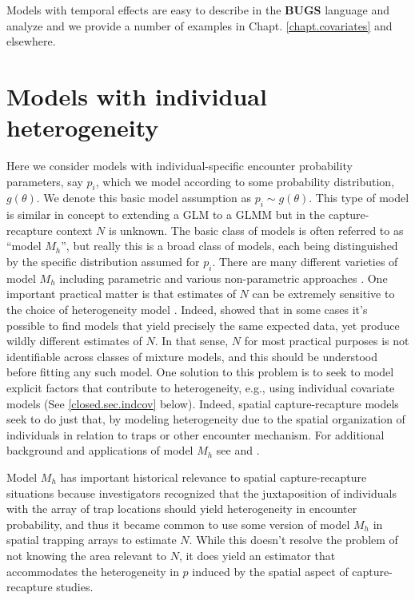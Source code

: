 Models with temporal effects are easy to describe in the {\bf BUGS} language
and analyze and we provide a number of examples in
Chapt. \ref{chapt.covariates} and elsewhere.


\section{ Models with individual heterogeneity}
\label{closed.sec.modelmh}

Here we consider models with individual-specific encounter probability
parameters, say $p_{i}$, which we model according to some probability
distribution, $g(\theta)$. We denote this basic model assumption as
$p_{i} \sim g(\theta)$. This type of model is similar in concept to
extending a GLM to a GLMM but in the capture-recapture context $N$ is
unknown.  The basic class of models is often referred to as ``model
$M_h$'', but really this is a broad class of models, each being
distinguished by the specific distribution assumed for $p_{i}$.  There
are many different varieties of model $M_{h}$ including parametric and
various %
non-parametric approaches
\citep{burnham_overton:1978, norris_pollock:1996, pledger:2000}. One
important practical matter is that estimates of $N$ can be extremely
sensitive to the choice of heterogeneity model
\citep{fienberg_etal:1999, dorazio_royle:2003, link:2003}. Indeed,
\citet{link:2003} showed that in some cases it's possible to find
models that yield precisely the same expected data, yet produce wildly
different estimates of $N$. In that sense, $N$ for most practical
purposes is not identifiable across classes of mixture models, and
this should be understood before fitting any such model. One solution
to this problem is to seek to model explicit factors that contribute
to heterogeneity, e.g., using individual covariate models (See
\ref{closed.sec.indcov} below). Indeed, spatial capture-recapture
models seek to do just that, by modeling heterogeneity due to the
spatial organization of individuals in relation to traps or other
encounter mechanism.  For additional background and applications of
model $M_{h}$ see \citet[][Chapt. 6]{royle_dorazio:2008} and
\citet[][Chapt. 6]{kery_schaub:2011}.

Model $M_{h}$ has important historical relevance to spatial
capture-recapture situations \citep{karanth:1995} because
investigators recognized that the juxtaposition of individuals with
the array of trap locations should yield heterogeneity in encounter
probability, and thus it became common to use some version of model $M_h$
in spatial trapping arrays to estimate $N$.  While this doesn't
resolve the problem of not knowing the area relevant to $N$, it does
yield an estimator that accommodates the heterogeneity in $p$ induced
by the spatial aspect of capture-recapture studies.

